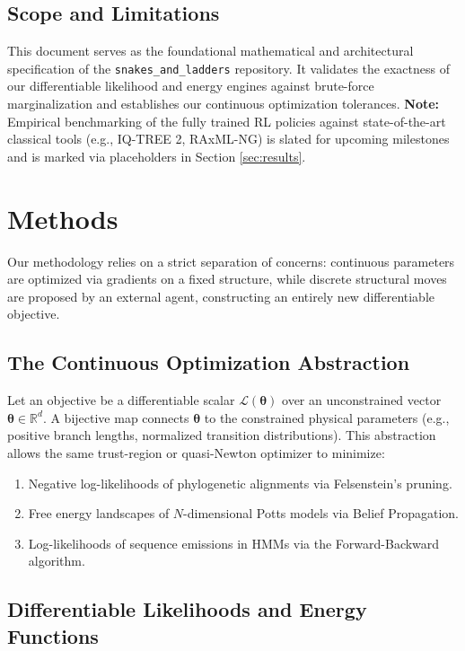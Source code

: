 \documentclass[11pt,a4paper]{article}
\newcommand{\params}{\boldsymbol{\theta}}
\newcommand{\objective}{\mathcal{L}}
\begin{document}
\subsection{Scope and Limitations}
This document serves as the foundational mathematical and architectural specification of the \texttt{snakes\_and\_ladders} repository. It validates the exactness of our differentiable likelihood and energy engines against brute-force marginalization and establishes our continuous optimization tolerances. \textbf{Note:} Empirical benchmarking of the fully trained RL policies against state-of-the-art classical tools (e.g., IQ-TREE 2, RAxML-NG) is slated for upcoming milestones and is marked via placeholders in Section \ref{sec:results}.

\section{Methods}
\label{sec:methods}

Our methodology relies on a strict separation of concerns: continuous parameters are optimized via gradients on a fixed structure, while discrete structural moves are proposed by an external agent, constructing an entirely new differentiable objective.

\subsection{The Continuous Optimization Abstraction}
\label{sec:notation-abstraction}

Let an objective be a differentiable scalar $\objective(\params)$ over an unconstrained vector $\params \in \mathbb{R}^d$. A bijective map connects $\params$ to the constrained physical parameters (e.g., positive branch lengths, normalized transition distributions). This abstraction allows the same trust-region or quasi-Newton optimizer \citep{nocedal2006} to minimize:
\begin{enumerate}
    \item Negative log-likelihoods of phylogenetic alignments via Felsenstein's pruning.
    \item Free energy landscapes of $N$-dimensional Potts models via Belief Propagation.
    \item Log-likelihoods of sequence emissions in HMMs via the Forward-Backward algorithm.
\end{enumerate}

\subsection{Differentiable Likelihoods and Energy Functions}
\end{document}
